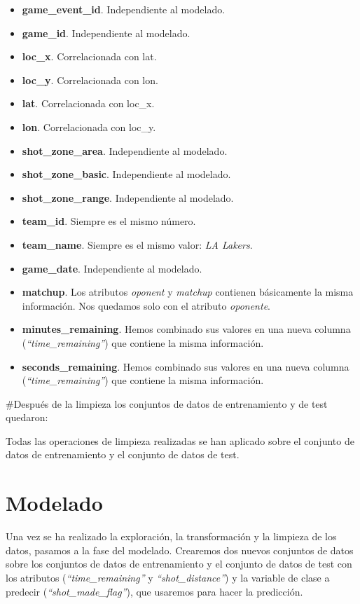 \documentclass[
]{article}
\providecommand{\tightlist}{%
  \setlength{\itemsep}{0pt}\setlength{\parskip}{0pt}}
\begin{document}
\begin{itemize}
\tightlist
\item
  \textbf{game\_event\_id}. Independiente al modelado.
\item
  \textbf{game\_id}. Independiente al modelado.
\item
  \textbf{loc\_x}. Correlacionada con lat.
\item
  \textbf{loc\_y}. Correlacionada con lon.
\item
  \textbf{lat}. Correlacionada con loc\_x.
\item
  \textbf{lon}. Correlacionada con loc\_y.
\item
  \textbf{shot\_zone\_area}. Independiente al modelado.
\item
  \textbf{shot\_zone\_basic}. Independiente al modelado.
\item
  \textbf{shot\_zone\_range}. Independiente al modelado.
\item
  \textbf{team\_id}. Siempre es el mismo número.
\item
  \textbf{team\_name}. Siempre es el mismo valor: \emph{LA Lakers}.
\item
  \textbf{game\_date}. Independiente al modelado.
\item
  \textbf{matchup}. Los atributos \emph{oponent} y \emph{matchup}
  contienen básicamente la misma información. Nos quedamos solo con el
  atributo \emph{oponente}.
\item
  \textbf{minutes\_remaining}. Hemos combinado sus valores en una nueva
  columna (\emph{``time\_remaining''}) que contiene la misma
  información.
\item
  \textbf{seconds\_remaining}. Hemos combinado sus valores en una nueva
  columna (\emph{``time\_remaining''}) que contiene la misma
  información.
\end{itemize}

\#Después de la limpieza los conjuntos de datos de entrenamiento y de
test quedaron:

Todas las operaciones de limpieza realizadas se han aplicado sobre el
conjunto de datos de entrenamiento y el conjunto de datos de test.

\hypertarget{modelado}{%
\section{\texorpdfstring{\textbf{Modelado}}{Modelado}}\label{modelado}}

Una vez se ha realizado la exploración, la transformación y la limpieza
de los datos, pasamos a la fase del modelado. Crearemos dos nuevos
conjuntos de datos sobre los conjuntos de datos de entrenamiento y el
conjunto de datos de test con los atributos (\emph{``time\_remaining''}
y \emph{``shot\_distance''}) y la variable de clase a predecir
(\emph{``shot\_made\_flag''}), que usaremos para hacer la predicción.
\end{document}
